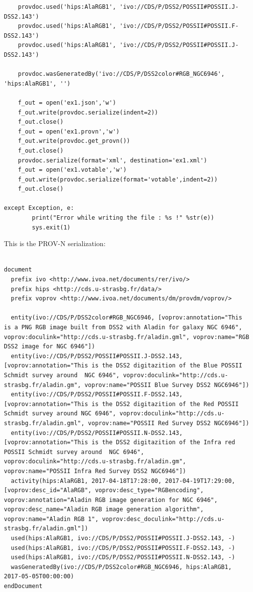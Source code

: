 \begin{verbatim}
    provdoc.used('hips:AlaRGB1', 'ivo://CDS/P/DSS2/POSSII#POSSII.J-DSS2.143')
    provdoc.used('hips:AlaRGB1', 'ivo://CDS/P/DSS2/POSSII#POSSII.F-DSS2.143')
    provdoc.used('hips:AlaRGB1', 'ivo://CDS/P/DSS2/POSSII#POSSII.J-DSS2.143')

    provdoc.wasGeneratedBy('ivo://CDS/P/DSS2color#RGB_NGC6946', 'hips:AlaRGB1', '')

    f_out = open('ex1.json','w')
    f_out.write(provdoc.serialize(indent=2))
    f_out.close()
    f_out = open('ex1.provn','w')
    f_out.write(provdoc.get_provn())
    f_out.close()
    provdoc.serialize(format='xml', destination='ex1.xml')
    f_out = open('ex1.votable','w')
    f_out.write(provdoc.serialize(format='votable',indent=2))
    f_out.close()

except Exception, e:
        print("Error while writing the file : %s !" %str(e))
        sys.exit(1)

\end{verbatim}

This is the PROV-N serialization:

\begin{verbatim}

document
  prefix ivo <http://www.ivoa.net/documents/rer/ivo/>
  prefix hips <http://cds.u-strasbg.fr/data/>
  prefix voprov <http://www.ivoa.net/documents/dm/provdm/voprov/>

  entity(ivo://CDS/P/DSS2color#RGB_NGC6946, [voprov:annotation="This is a PNG RGB image built from DSS2 with Aladin for galaxy NGC 6946", voprov:doculink="http://cds.u-strasbg.fr/aladin.gml", voprov:name="RGB DSS2 image for NGC 6946"])
  entity(ivo://CDS/P/DSS2/POSSII#POSSII.J-DSS2.143, [voprov:annotation="This is the DSS2 digitazition of the Blue POSSII Schmidt survey around  NGC 6946", voprov:doculink="http://cds.u-strasbg.fr/aladin.gm", voprov:name="POSSII Blue Survey DSS2 NGC6946"])
  entity(ivo://CDS/P/DSS2/POSSII#POSSII.F-DSS2.143, [voprov:annotation="This is the DSS2 digitazition of the Red POSSII Schmidt survey around NGC 6946", voprov:doculink="http://cds.u-strasbg.fr/aladin.gml", voprov:name="POSSII Red Survey DSS2 NGC6946"])
  entity(ivo://CDS/P/DSS2/POSSII#POSSII.N-DSS2.143, [voprov:annotation="This is the DSS2 digitazition of the Infra red POSSII Schmidt survey around  NGC 6946", voprov:doculink="http://cds.u-strasbg.fr/aladin.gm", voprov:name="POSSII Infra Red Survey DSS2 NGC6946"])
  activity(hips:AlaRGB1, 2017-04-18T17:28:00, 2017-04-19T17:29:00, [voprov:desc_id="AlaRGB", voprov:desc_type="RGBencoding", voprov:annotation="Aladin RGB image generation for NGC 6946", voprov:desc_name="Aladin RGB image generation algorithm", voprov:name="Aladin RGB 1", voprov:desc_doculink="http://cds.u-strasbg.fr/aladin.gml"])
  used(hips:AlaRGB1, ivo://CDS/P/DSS2/POSSII#POSSII.J-DSS2.143, -)
  used(hips:AlaRGB1, ivo://CDS/P/DSS2/POSSII#POSSII.F-DSS2.143, -)
  used(hips:AlaRGB1, ivo://CDS/P/DSS2/POSSII#POSSII.N-DSS2.143, -)
  wasGeneratedBy(ivo://CDS/P/DSS2color#RGB_NGC6946, hips:AlaRGB1, 2017-05-05T00:00:00)
endDocument

\end{verbatim}

